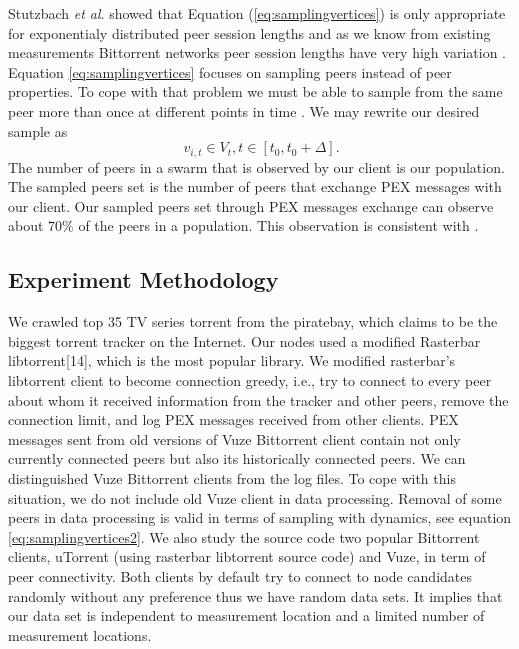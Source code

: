\documentclass[10pt,conference,letterpaper]{IEEEtran}
\begin{document}
Stutzbach \textit{et al}. \cite{stutzbach2007sampling} showed that  Equation (\ref{eq:samplingvertices}) is only appropriate for exponentialy distributed  peer session lengths and as we know from existing measurements Bittorrent networks peer session lengths have very high variation \cite{guo2005measurements}.  
Equation \ref{eq:samplingvertices} focuses on sampling peers instead of peer properties. 
To cope with that problem we must be able to sample from the same peer more than once at different points in time \cite{stutzbach2007sampling}. 
We may rewrite our desired sample as
\begin{equation}
\ v_{i,t} \in V_t  , t \in [t_0, t_0 + \Delta].
\label{eq:samplingvertices2}
\end{equation}
The number of peers in a swarm that is observed by our client is our population. 
The sampled peers set is the number of peers that exchange PEX messages with our client.
Our sampled peers set through PEX messages exchange can observe about $70\%$ of the peers in a population.
This observation is consistent with \cite{wu2010understanding}.

\subsection{Experiment Methodology}
We crawled top 35 TV series torrent from the piratebay, which claims to be the biggest torrent tracker on the Internet.
Our nodes used a modified Rasterbar libtorrent[14], which is the most popular library.  %
We modified rasterbar's libtorrent client to become connection greedy, i.e., try to connect to every peer about whom it received information from the tracker and other peers, remove the connection limit, and log PEX messages received from other clients.
PEX messages sent from old versions of Vuze Bittorrent client contain not only currently connected peers but also its historically connected peers. 
We can distinguished Vuze Bittorrent clients from the log files.
To cope with this situation, we do not include old Vuze client in data processing. 
Removal of some peers in data processing is valid in terms of sampling with dynamics, see equation \ref{eq:samplingvertices2}.
We also study the source code two popular Bittorrent clients, uTorrent (using rasterbar libtorrent source code) and Vuze, in term of peer connectivity.
Both clients by default try to connect to node candidates randomly without any preference thus we have random data sets.
It implies that our data set is independent to measurement location and a limited number of measurement locations.
\end{document}

